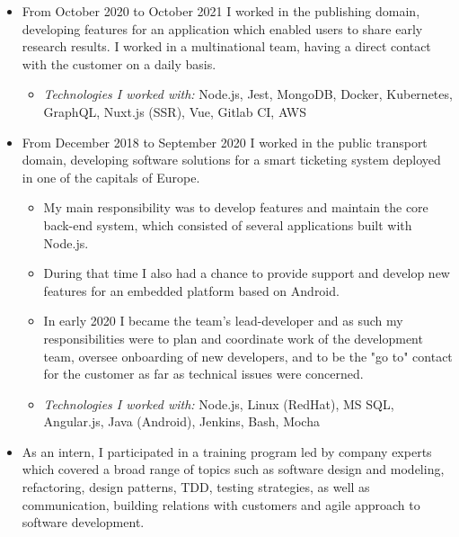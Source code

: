 \documentclass[10pt,a4paper,ragged2e]{altacv}
\begin{document}
\begin{itemize}
    \item From October 2020 to October 2021 I worked in the publishing domain, developing features for
    an application which enabled users to share early research results.
    I worked in a multinational team, having a direct contact with the customer on a daily basis.
    \begin{itemize}
        \item \textit{Technologies I worked with:} Node.js, Jest, MongoDB, Docker, Kubernetes, GraphQL, Nuxt.js (SSR),
        Vue, Gitlab CI, AWS
    \end{itemize}
 \divider
    \item From December 2018 to September 2020 I worked in the public transport domain,
    developing software solutions for a smart ticketing system deployed in one of the capitals of Europe.
    \begin{itemize}
        \item My main responsibility was to develop features and maintain the core back-end system,
        which consisted of several applications built with Node.js.
        \item During that time I also had a chance to provide support and develop new features
        for an embedded platform based on Android.
        \item In early 2020 I became the team’s lead-developer and as such my responsibilities
        were to plan and coordinate work of the development team, oversee onboarding of new
        developers, and to be the "go to" contact for the customer as far as technical
        issues were concerned.
        \item \textit{Technologies I worked with:} Node.js, Linux (RedHat), MS SQL, Angular.js,
        Java (Android), Jenkins, Bash, Mocha
    \end{itemize}
\end{itemize}

\divider

\begin{itemize}
    \item As an intern, I participated in a training program led by company experts
    which covered a broad range of topics such as software design and modeling,
    refactoring, design patterns, TDD, testing strategies, as well as communication,
    building relations with customers and agile approach to software development.
\end{itemize}
\end{document}
